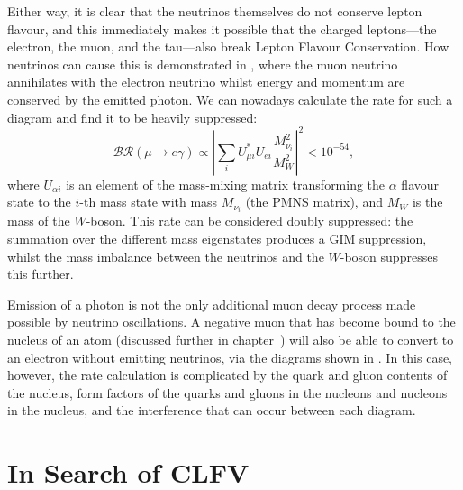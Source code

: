 Either way, it is clear that the neutrinos themselves do not conserve lepton flavour, and this immediately makes it possible that the charged leptons---the electron, the muon, and the tau---also break Lepton Flavour Conservation.
How neutrinos can cause this is demonstrated in , where the muon neutrino annihilates with the electron neutrino whilst energy and momentum are conserved by the emitted photon.
We can nowadays calculate the rate for such a diagram and find it to be heavily suppressed:
\begin{equation}
\mathcal{BR}(\mu\rightarrow{}e\gamma)\propto\left|\sum_iU^*_{\mu i}U_{ei} \frac{M^2_{\nu_i}}{M^2_W}\right|^2 < 10^{-54},
\end{equation}
where $U_{\alpha i}$ is an element of the mass-mixing matrix transforming the $\alpha$ flavour state to the $i$-th mass state with mass $M_{\nu_i}$ (the \ac{PMNS} matrix), and $M_W$ is the mass of the $W$-boson.
This rate can be considered doubly suppressed: the summation over the different mass eigenstates produces a GIM suppression, whilst the mass imbalance between the neutrinos and the $W$-boson suppresses this further.
\FigTheoryMuEConvViaNeutrino

Emission of a photon is not the only additional muon decay process made possible by neutrino oscillations.
A negative muon that has become bound to the nucleus of an atom (discussed further in chapter~) will also be able to convert to an electron without emitting neutrinos, via the diagrams
shown in .  
In this case, however, the rate calculation is complicated by the quark and gluon contents of the nucleus, form factors of the quarks and gluons in the nucleons and nucleons in the nucleus, and the interference that can occur between each diagram.

\section{In Search of \acf{CLFV}}
